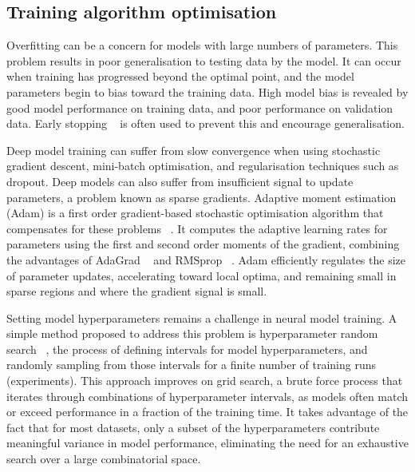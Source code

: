 \subsection{Training algorithm optimisation} 

Overfitting can be a concern for models with large numbers of parameters. This problem results in poor generalisation to testing data by the model. It can occur when training has progressed beyond the optimal point, and the model parameters begin to bias toward the training data. High model bias is revealed by good model performance on training data, and poor performance on validation data. Early stopping \unskip~\citep{prechelt1998early} is often used to prevent this and encourage generalisation. \par

\noindent Deep model training can suffer from slow convergence when using stochastic gradient descent, mini-batch optimisation, and regularisation techniques such as dropout. Deep models can also suffer from insufficient signal to update parameters, a problem known as sparse gradients. Adaptive moment estimation (Adam) is a first order gradient-based stochastic optimisation algorithm that compensates for these problems \unskip ~\citep{kingma2014adam}. It computes the adaptive learning rates for parameters using the first and second order moments of the gradient, combining the advantages of AdaGrad ~\citep{duchi2011adaptive} and RMSprop ~\citep{tieleman2012lecture}. Adam efficiently regulates the size of parameter updates, accelerating toward local optima, and remaining small in sparse regions and where the gradient signal is small. \par

\noindent Setting model hyperparameters remains a challenge in neural model training. A simple method proposed to address this problem is hyperparameter random search \unskip ~\citep{bergstra2012random}, the process of defining intervals for model hyperparameters, and randomly sampling from those intervals for a finite number of training runs (experiments). This approach improves on grid search, a brute force process that iterates through combinations of hyperparameter intervals, as models often match or exceed performance in a fraction of the training time. It takes advantage of the fact that for most datasets, only a subset of the hyperparameters contribute meaningful variance in model performance, eliminating the need for an exhaustive search over a large combinatorial space. \par

